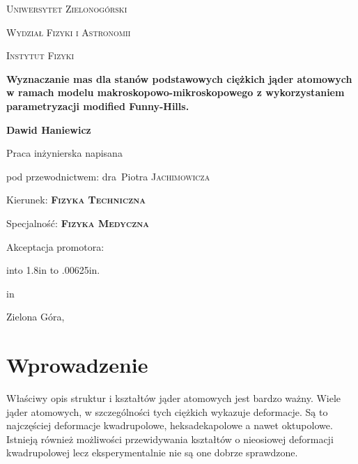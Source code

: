 \documentclass[polish]{article}
\def\signature#1#2#3{{\hskip#1in{\hbox to #2in%
{\leaders\hbox to .00625in{\hfil.\hfil}\hfill}}%
 \par\hskip#1in#3\vskip1cm}}
\numberwithin{equation}{section}
\begin{document}
\begin{titlepage}
	\centering
	\begin{figure}[t]
	\centering
	\end{figure}
	\vspace{1cm}
	{\scshape\huge Uniwersytet Zielonogórski \par}
	{\scshape\LARGE Wydział Fizyki i Astronomii \par}
	{\scshape\Large Instytut Fizyki \par}
	\vspace{2.5cm}
	{\Large\bfseries Wyznaczanie mas dla stanów podstawowych ciężkich jąder atomowych w ramach modelu makroskopowo-mikroskopowego z wykorzystaniem parametryzacji modified Funny-Hills. \par}
	\vspace{1cm}
	{\Large\textbf{Dawid Haniewicz} \par}
	\vspace{2cm}
	Praca inżynierska napisana \par
	pod przewodnictwem: dra~Piotra \textsc{Jachimowicza} \par
	\vspace{1.5cm}
	{Kierunek: \textsc{\textbf{Fizyka Techniczna}} \par}
	{Specjalność: \textsc{\textbf{Fizyka Medyczna}} \par}
	\vspace{1.5cm}
	Akceptacja promotora: \par
	\vspace{0.5cm}
	\signature{0}{1.8}
	\vfill
	{\large Zielona Góra, \the\year \par}
\thispagestyle{empty}
\end{titlepage}

\setcounter{page}{2}

\clearpage
\tableofcontents
\clearpage


\section{Wprowadzenie}

Właściwy opis struktur i kształtów jąder atomowych jest bardzo ważny. Wiele jąder atomowych, w szczególności tych ciężkich wykazuje deformacje. Są to najczęściej deformacje kwadrupolowe, heksadekapolowe a nawet oktupolowe.
Istnieją również możliwości przewidywania kształtów o nieosiowej deformacji kwadrupolowej lecz eksperymentalnie nie są one dobrze sprawdzone.
\end{document}
